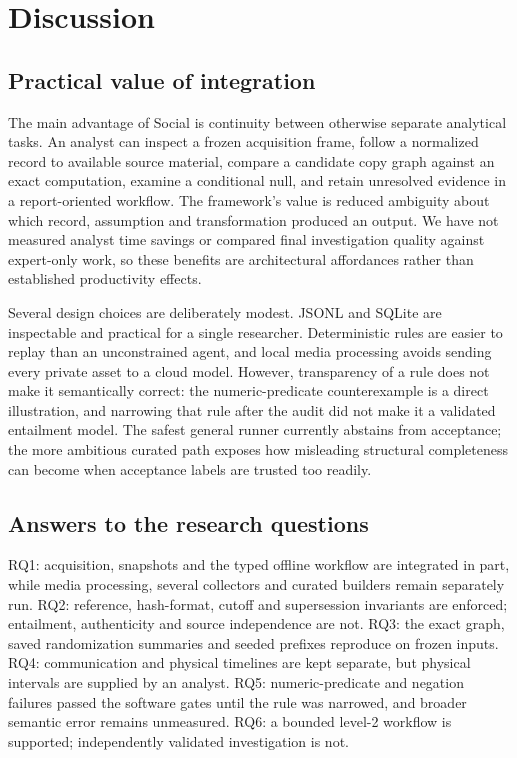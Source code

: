 \section{Discussion}
\subsection{Practical value of integration}
The main advantage of Social is continuity between otherwise separate analytical tasks. An analyst can inspect a frozen acquisition frame, follow a normalized record to available source material, compare a candidate copy graph against an exact computation, examine a conditional null, and retain unresolved evidence in a report-oriented workflow. The framework's value is reduced ambiguity about which record, assumption and transformation produced an output. We have not measured analyst time savings or compared final investigation quality against expert-only work, so these benefits are architectural affordances rather than established productivity effects.

Several design choices are deliberately modest. JSONL and SQLite are inspectable and practical for a single researcher. Deterministic rules are easier to replay than an unconstrained agent, and local media processing avoids sending every private asset to a cloud model. However, transparency of a rule does not make it semantically correct: the numeric-predicate counterexample is a direct illustration, and narrowing that rule after the audit did not make it a validated entailment model. The safest general runner currently abstains from acceptance; the more ambitious curated path exposes how misleading structural completeness can become when acceptance labels are trusted too readily.

\subsection{Answers to the research questions}
RQ1: acquisition, snapshots and the typed offline workflow are integrated in part, while media processing, several collectors and curated builders remain separately run. RQ2: reference, hash-format, cutoff and supersession invariants are enforced; entailment, authenticity and source independence are not. RQ3: the exact graph, saved randomization summaries and seeded prefixes reproduce on frozen inputs. RQ4: communication and physical timelines are kept separate, but physical intervals are supplied by an analyst. RQ5: numeric-predicate and negation failures passed the software gates until the rule was narrowed, and broader semantic error remains unmeasured. RQ6: a bounded level-2 workflow is supported; independently validated investigation is not.

